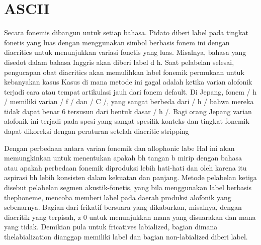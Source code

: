 \section{ASCII}
Secara fonemis dibangun untuk setiap bahasa.
Pidato diberi label pada tingkat fonetis yang luas dengan menggunakan simbol berbasis fonem ini dengan diacritics
untuk menunjukkan variasi fonetis yang luas. Misalnya, bahasa yang disedot dalam bahasa Inggris akan diberi label d h.
Saat pelabelan selesai, pengucapan obat diacritics akan memulihkan label fonemik permukaan
untuk kebanyakan kasus Kasus di mana metode ini gagal adalah ketika varian alofonik terjadi
cara atau tempat artikulasi jauh dari fonem default. Di Jepang, fonem / h /
memiliki varian / f / dan / C /, yang sangat berbeda dari / h / bahwa mereka tidak dapat benar 6
tersusun dari bentuk dasar / h /. Bagi orang Jepang varian alofonik ini terjadi pada spesi yang sangat spesifik
konteks dan tingkat fonemik dapat dikoreksi dengan peraturan setelah diacritic stripping

Dengan perbedaan antara varian fonemik dan allophonic labe Hal ini akan memungkinkan untuk menentukan apakah bh tangan b mirip dengan bahasa atau apakah perbedaan fonemik diproduksi lebih hati-hati dan oleh karena itu aspirasi bh lebih konsisten dalam kekuatan dan panjang. Metode pelabelan ketiga disebut pelabelan segmen akustik-fonetis, yang bila menggunakan label berbasis thephoneme, mencoba memberi label pada daerah produksi alofonik yang sebenarnya. Bagian dari frikatif bersuara yang dikaburkan, misalnya, dengan diacritik yang terpisah, z 0 untuk menunjukkan mana yang disuarakan dan mana yang tidak. Demikian pula untuk fricatives labialized, bagian dimana thelabialization dianggap memiliki label dan bagian non-labialized diberi label. 